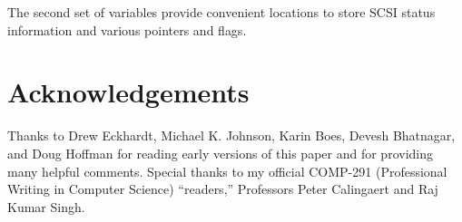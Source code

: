 The second set of variables provide convenient locations to store SCSI
status information and various pointers and flags.

\section{Acknowledgements}

Thanks to Drew Eckhardt, Michael K. Johnson, Karin Boes, Devesh Bhatnagar,
and Doug Hoffman for reading early versions of this paper and for providing
many helpful comments.  Special thanks to my official COMP-291
(Professional Writing in Computer Science) ``readers,'' Professors Peter
Calingaert and Raj Kumar Singh.

\begin{singlespace}
  
\end{singlespace}


